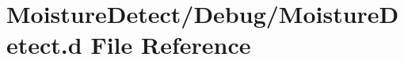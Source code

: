 \hypertarget{_moisture_detect_8d}{}\section{Moisture\+Detect/\+Debug/\+Moisture\+Detect.d File Reference}
\label{_moisture_detect_8d}
